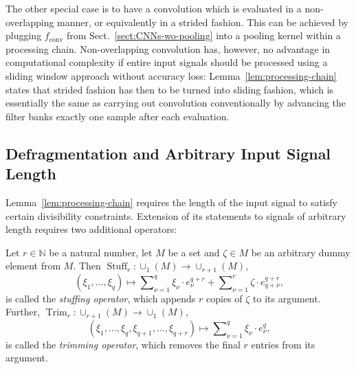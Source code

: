 \documentclass[journal]{IEEEtran}
\newcommand{\N}{\mathbb{N}}
\DeclareMathOperator{\convop}{conv}
\DeclareMathOperator{\Stuffing}{Stuff}
\DeclareMathOperator{\Trimming}{Trim}
\begin{document}
The other special case is to have a convolution which is evaluated in a non-overlapping manner, or equivalently in a strided fashion.
This can be achieved by plugging $f_{\convop}$ from Sect.~\ref{sect:CNNs-wo-pooling} into a pooling kernel within a processing chain.
Non-overlapping convolution has, however, no advantage in computational complexity if entire input signals should be processed using a sliding window approach without accuracy loss:
Lemma~\ref{lem:processing-chain} states that strided fashion has then to be turned into sliding fashion, which is essentially the same as carrying out convolution conventionally by advancing the filter banks exactly one sample after each evaluation.

\subsection{Defragmentation and Arbitrary Input Signal Length}
Lemma~\ref{lem:processing-chain} requires the length of the input signal to satisfy certain divisibility constraints.
Extension of its statements to signals of arbitrary length requires two additional operators:
\begin{definition}
\label{def:stuff-trim}
Let $r\in\N$ be a natural number, let $M$ be a set and $\zeta\in M$ be an arbitrary dummy element from $M$.
Then $\Stuffing_r\colon\cup_1(M) \to \cup_{r + 1}(M)$,
\begin{displaymath}
  (\xi_1,\dotsc,\xi_q)\mapsto \sum\nolimits_{\nu = 1}^q \xi_\nu\cdot e_\nu^{q + r} + \sum\nolimits_{\nu = 1}^r \zeta\cdot e_{q + \nu}^{q + r}\text{,}
\end{displaymath}
is called the \emph{stuffing operator}, which appends $r$ copies of $\zeta$ to its argument.
Further, $\Trimming_r\colon\cup_{r + 1}(M) \to \cup_1(M)$,
\begin{displaymath}
  (\xi_1,\dotsc,\xi_q,\xi_{q + 1},\dotsc,\xi_{q + r}) \mapsto \sum\nolimits_{\nu = 1}^q \xi_\nu\cdot e_\nu^q\text{,}
\end{displaymath}
is called the \emph{trimming operator}, which removes the final $r$ entries from its argument.
\end{definition}
\end{document}
